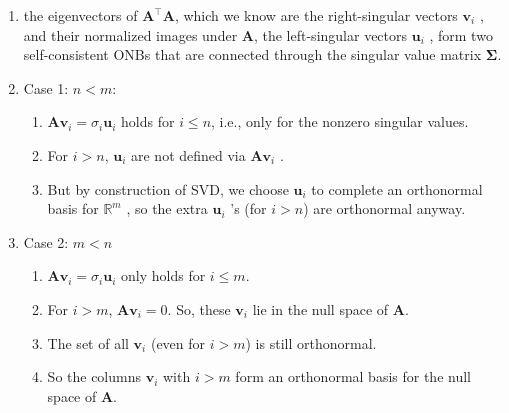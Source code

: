 \begin{enumerate}
\begin{enumerate}
    \end{enumerate}
    
    \item the eigenvectors of $\bm{A} ^\top \bm{A}$, which we know are the right-singular vectors $\bm{v}_i$ , and their normalized images under $\bm{A}$, the left-singular vectors $\bm{u}_i$ , form two self-consistent ONBs that are connected through the singular value matrix $\bm{\Sigma}$.
    \hfill \cite{mfml/book/mml/Deisenroth-Faisal-Ong}

    \item Case 1: $n<m$:
    \begin{enumerate}
        \item $\bm{Av}_i = \sigma_i \bm{u}_i$ holds for $i\leq n$, i.e., only for the nonzero singular values.
        \hfill \cite{mfml/book/mml/Deisenroth-Faisal-Ong, common/online/chatgpt}

        \item For $i>n$, $\bm{u} _i$  are not defined via $\bm{Av}_ i$ .
        \hfill \cite{mfml/book/mml/Deisenroth-Faisal-Ong, common/online/chatgpt}

        \item But by construction of SVD, we choose $\bm{u}_ i$  to complete an orthonormal basis for $\mathbb{R}^ m$ , so the extra $\bm{u}_ i$ 's (for $i>n$) are orthonormal anyway.
        \hfill \cite{mfml/book/mml/Deisenroth-Faisal-Ong, common/online/chatgpt}
    \end{enumerate}

    \item Case 2: $m<n$
    \begin{enumerate}
        \item $\bm{Av}_i = \sigma_i \bm{u}_i$ only holds for $i\leq m$.
        \hfill \cite{mfml/book/mml/Deisenroth-Faisal-Ong, common/online/chatgpt}

        \item For $i>m$, $\bm{Av}_ i =0$. So, these $\bm{v}_ i$  lie in the null space of $\bm{A}$.
        \hfill \cite{mfml/book/mml/Deisenroth-Faisal-Ong, common/online/chatgpt}

        \item The set of all $\bm{v}_ i$  (even for $i>m$) is still orthonormal.
        \hfill \cite{mfml/book/mml/Deisenroth-Faisal-Ong, common/online/chatgpt}

        \item So the columns $\bm{v}_ i$  with $i>m$ form an orthonormal basis for the null space of $\bm{A}$.
        \hfill \cite{mfml/book/mml/Deisenroth-Faisal-Ong, common/online/chatgpt}
    \end{enumerate}
\end{enumerate}





